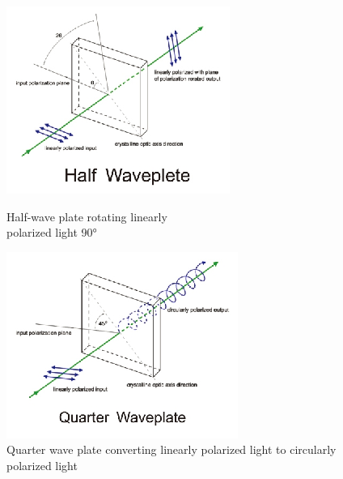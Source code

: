 \documentclass{article}
\begin{document}
\begin{figure}[!phbt]
\begin{minipage}{0.5\linewidth}
    \centering
    \includegraphics[width=\linewidth]{img/halfwp.eps}
    \caption{Half-wave plate rotating linearly\\ polarized light 90°}
    \label{fig:halfwp}
\end{minipage}
\begin{minipage}{0.5\linewidth}
    \centering
    \includegraphics[width=\linewidth]{img/quarterwp.eps}
    \caption{Quarter wave plate converting linearly polarized light to circularly polarized light}
    \label{fig:quarterwp}
\end{minipage}
\end{figure}
\end{document}
